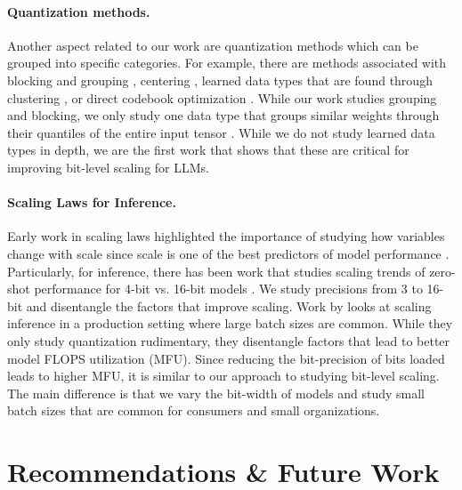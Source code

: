 \paragraph{Quantization methods.} Another aspect related to our work are quantization methods which can be grouped into specific categories. For example, there are methods associated with blocking and grouping \cite{park2022nuqmm, wu2020integer, jain2020trained, nagel2019data, krishnamoorthi2018quantizing, rusci2020memory}, centering \citep{krishnamoorthi2018quantizing, jacob2017quantization}, learned data types that are found through clustering \citep{gong2014compressing, han2015deep, choi2016towards, park2017weighted}, or direct codebook optimization \citep{Rastegari2016xnor, hou2016loss, leng2018extremely, zhang2018lq}. While our work studies grouping and blocking, we only study one data type that groups similar weights through their quantiles of the entire input tensor \citep{dettmers2022optimizers}. While we do not study learned data types in depth, we are the first work that shows that these are critical for improving bit-level scaling for LLMs.

\paragraph{Scaling Laws for Inference.} Early work in scaling laws highlighted the importance of studying how variables change with scale since scale is one of the best predictors of model performance \citep{kaplan2020scaling,rosenfeld2019constructive,hestness2017deep}. Particularly, for inference, there has been work that studies scaling trends of zero-shot performance for 4-bit vs. 16-bit models \citep{zeng2022glm}. We study precisions from 3 to 16-bit and disentangle the factors that improve scaling. Work by \citet{pope2022efficiently} looks at scaling inference in a production setting where large batch sizes are common. While they only study quantization rudimentary, they disentangle factors that lead to better model FLOPS utilization (MFU). Since reducing the bit-precision of bits loaded leads to higher MFU, it is similar to our approach to studying bit-level scaling. The main difference is that we vary the bit-width of models and study small batch sizes that are common for consumers and small organizations. 

\section{Recommendations \& Future Work}


